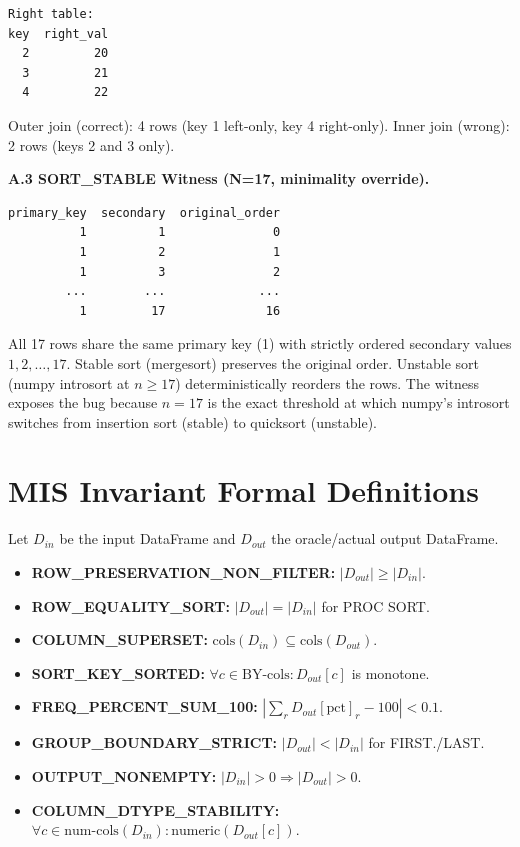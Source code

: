 \documentclass[conference]{IEEEtran}
\begin{document}
\begin{lstlisting}
Right table:
key  right_val
  2         20
  3         21
  4         22
\end{lstlisting}

Outer join (correct): 4 rows (key 1 left-only, key 4 right-only).
Inner join (wrong): 2 rows (keys 2 and 3 only).

\textbf{A.3 SORT\_STABLE Witness (N=17, minimality override).}

\begin{lstlisting}
primary_key  secondary  original_order
          1          1               0
          1          2               1
          1          3               2
        ...        ...             ...
          1         17              16
\end{lstlisting}

All 17 rows share the same primary key (1) with strictly ordered secondary values
$1, 2, \ldots, 17$. Stable sort (mergesort) preserves the original order.
Unstable sort (numpy introsort at $n \geq 17$) deterministically reorders the rows.
The witness exposes the bug because $n = 17$ is the exact threshold at which numpy's
introsort switches from insertion sort (stable) to quicksort (unstable).

\section{MIS Invariant Formal Definitions}

Let $D_{in}$ be the input DataFrame and $D_{out}$ the oracle/actual output DataFrame.

\begin{itemize}
  \item \textbf{ROW\_PRESERVATION\_NON\_FILTER:}
        $|D_{out}| \geq |D_{in}|$.
  \item \textbf{ROW\_EQUALITY\_SORT:}
        $|D_{out}| = |D_{in}|$ for PROC SORT.
  \item \textbf{COLUMN\_SUPERSET:}
        $\text{cols}(D_{in}) \subseteq \text{cols}(D_{out})$.
  \item \textbf{SORT\_KEY\_SORTED:}
        $\forall c \in \text{BY-cols}: D_{out}[c]$ is monotone.
  \item \textbf{FREQ\_PERCENT\_SUM\_100:}
        $\left|\sum_r D_{out}[\text{pct}]_r - 100\right| < 0.1$.
  \item \textbf{GROUP\_BOUNDARY\_STRICT:}
        $|D_{out}| < |D_{in}|$ for FIRST./LAST.
  \item \textbf{OUTPUT\_NONEMPTY:}
        $|D_{in}| > 0 \Rightarrow |D_{out}| > 0$.
  \item \textbf{COLUMN\_DTYPE\_STABILITY:}
        $\forall c \in \text{num-cols}(D_{in}): \text{numeric}(D_{out}[c])$.
\end{itemize}
\end{document}
